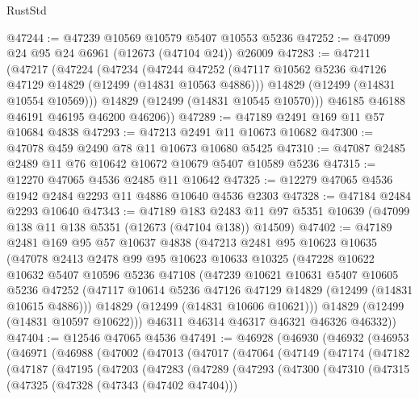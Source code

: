 \begin{lexlean}{RustStd}
\begin{coremodule}
{\begin{coremodule}
{{{{{{{{{{{{{{{{{{{{{{{{{{{{{{{{{{{{{{{{{{{{{{{{{{{{{{{{{{{{{{{{{{{{{{{{{{{{{{{{@47244 := @47239 @10569 @10579 @5407 @10553 @5236
@47252 := @47099 @24 @95 @24 @6961 (@12673 (@47104 @24)) @26009
@47283 := @47211
    (@47217
      (@47224
        (@47234
          (@47244
            @47252
            (@47117 @10562 @5236 @47126 @47129 @14829 (@12499 (@14831 @10563 @4886)))
            @14829
            (@12499 (@14831 @10554 @10569)))
          @14829
          (@12499 (@14831 @10545 @10570)))
        @46185
        @46188
        @46191
        @46195
        @46200
        @46206))
@47289 := @47189 @2491 @169 @11 @57 @10684 @4838
@47293 := @47213 @2491 @11 @10673 @10682
@47300 := @47078 @459 @2490 @78 @11 @10673 @10680 @5425
@47310 := @47087 @2485 @2489 @11 @76 @10642 @10672 @10679 @5407 @10589 @5236
@47315 := @12270 @47065 @4536 @2485 @11 @10642
@47325 := @12279 @47065 @4536 @1942 @2484 @2293 @11 @4886 @10640 @4536 @2303
@47328 := @47184 @2484 @2293 @10640
@47343 := @47189
    @183
    @2483
    @11
    @97
    @5351
    @10639
    (@47099 @138 @11 @138 @5351 (@12673 (@47104 @138)) @14509)
@47402 := @47189
    @2481
    @169
    @95
    @57
    @10637
    @4838
    (@47213
      @2481
      @95
      @10623
      @10635
      (@47078
        @2413
        @2478
        @99
        @95
        @10623
        @10633
        @10325
        (@47228
          @10622
          @10632
          @5407
          @10596
          @5236
          @47108
          (@47239
            @10621
            @10631
            @5407
            @10605
            @5236
            @47252
            (@47117 @10614 @5236 @47126 @47129 @14829 (@12499 (@14831 @10615 @4886)))
            @14829
            (@12499 (@14831 @10606 @10621)))
          @14829
          (@12499 (@14831 @10597 @10622)))
        @46311
        @46314
        @46317
        @46321
        @46326
        @46332))
@47404 := @12546 @47065 @4536
@47491 := @46928
    (@46930
      (@46932
        (@46953
          (@46971
            (@46988
              (@47002
                (@47013
                  (@47017
                    (@47064
                      (@47149
                        (@47174
                          (@47182
                            (@47187
                              (@47195
                                (@47203
                                  (@47283
                                    (@47289
                                      (@47293
                                        (@47300
                                          (@47310
                                            (@47315
                                              (@47325
                                                (@47328 (@47343 (@47402 @47404)))
}}}}}}}}}}}}}}}}}}}}}}}}}}}}}}}}}}}}}}}}}}}}}}}}}}}}}}}}}}}}}}}}}}}}}}}}}}}}}}}}
\end{coremodule}}
\end{coremodule}
\end{lexlean}
